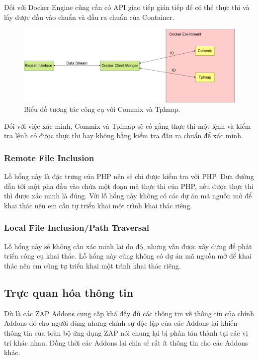 \documentclass[./../main.tex]{subfiles}
\begin{document}
Đối với Docker Engine cũng cần có API giao tiếp gián tiếp để có thể thực thi và lấy được đầu vào chuẩn và đầu ra chuẩn của Container.


\begin{figure}[h!]
	\includegraphics[width=\linewidth]{./images/DockerIO.png}
	\caption{Biểu đồ tương tác công cụ với Commix và Tplmap.}
	\label{fig:commix_tplmap}
\end{figure}

Đối với việc xác minh, Commix và Tplmap sẽ cố gắng thực thi một lệnh và kiểm tra lệnh có được thực thi hay không bằng kiểm tra đầu ra chuẩn để xác minh.

\subsubsection{Remote File Inclusion}
Lỗ hổng này là đặc trưng của PHP nên sẽ chỉ được kiểm tra với PHP. Đưa đường dẫn tới một pha đầu vào chứa một đoạn mã thực thi của PHP, nếu được thực thi thì được xác minh là đúng. Với lỗ hổng này không có các dự án mã nguồn mở để khai thác nên em cần tự triển khai một trình khai thác riêng.
\subsubsection{Local File Inclusion/Path Traversal}
Lỗ hổng này sẽ không cần xác minh lại do độ, nhưng vẫn được xây dựng để phát triển công cụ khai thác. Lỗ hổng này cũng không có dự án mã nguồn mở để khai thác nên em cũng tự triển khai một trình khai thác riêng.

\subsection{Trực quan hóa thông tin}
Dù là các ZAP Addons cung cấp khá đầy đủ các thông tin về thông tin của chính Addons đó cho người dùng nhưng chính sự độc lập của các Addons lại khiến thông tin của toàn bộ ứng dụng ZAP nói chung lại bị phân tán thành tại các vị trí khác nhau. Đồng thời các Addons lại chia sẻ rất ít thông tin cho các Addons khác.
\end{document}
